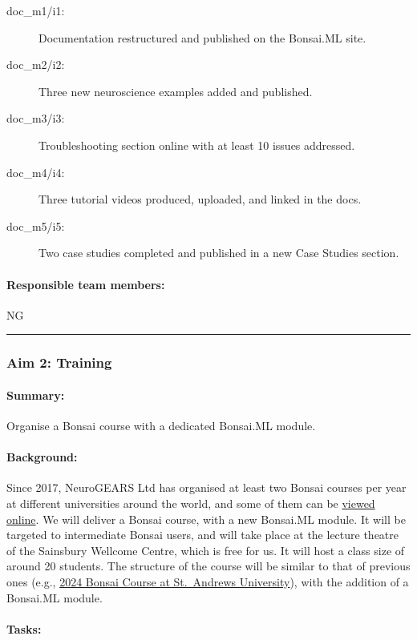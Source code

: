 \begin{description}
    \item[doc\_m1/i1:] Documentation restructured and published on the Bonsai.ML site.  
    \item[doc\_m2/i2:] Three new neuroscience examples added and published.  
    \item[doc\_m3/i3:] Troubleshooting section online with at least 10 issues addressed.  
    \item[doc\_m4/i4:] Three tutorial videos produced, uploaded, and linked in the docs.  
    \item[doc\_m5/i5:] Two case studies completed and published in a new Case Studies section.  
\end{description}

\paragraph{Responsible team members:} NG

\noindent\rule{\textwidth}{1pt}
\subsubsection{Aim 2: Training}
\paragraph{Summary:} Organise a Bonsai course with a dedicated Bonsai.ML module.

\paragraph{Background:} Since 2017, NeuroGEARS Ltd has organised at least two
Bonsai courses per year at different universities around the world, and some of
them can be \href{https://bonsai-rx.org/learn/}{viewed online}.
%
We will deliver a Bonsai course, with a new Bonsai.ML module. It will be
targeted to intermediate Bonsai users, and will take place at the lecture
theatre of the Sainsbury Wellcome Centre, which is free for us. It will host a
class size of around 20 students. The structure of the course will be similar
to that of previous ones (e.g.,
\href{https://neurogears.org/st-andrews-2024/}{2024 Bonsai Course at
St.~Andrews University}), with the addition of a Bonsai.ML module.

\paragraph{Tasks:}  

